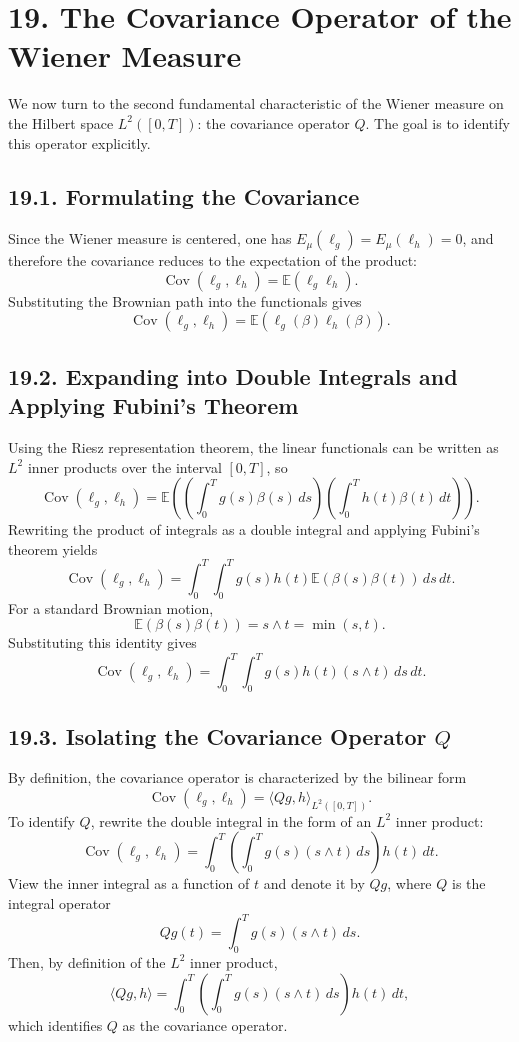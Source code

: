 \documentclass[11pt]{article}
\theoremstyle{definition}
\theoremstyle{remark}
\begin{document}
\section*{19. The Covariance Operator of the Wiener Measure}
We now turn to the second fundamental characteristic of the Wiener measure on the Hilbert space $L^2([0,T])$: the covariance operator $Q$. The goal is to identify this operator explicitly.

\subsection*{19.1. Formulating the Covariance}
Since the Wiener measure is centered, one has $E_\mu(\ell_g)=E_\mu(\ell_h)=0$, and therefore the covariance reduces to the expectation of the product:
\[
\operatorname{Cov}(\ell_g,\ell_h)=\mathbb E(\ell_g\ell_h).
\]
Substituting the Brownian path into the functionals gives
\[
\operatorname{Cov}(\ell_g,\ell_h)=\mathbb E(\ell_g(\beta)\ell_h(\beta)).
\]

\subsection*{19.2. Expanding into Double Integrals and Applying Fubini's Theorem}
Using the Riesz representation theorem, the linear functionals can be written as $L^2$ inner products over the interval $[0,T]$, so
\[
\operatorname{Cov}(\ell_g,\ell_h)
=
\mathbb E\left(\left(\int_0^T g(s)\beta(s)\,ds\right)\left(\int_0^T h(t)\beta(t)\,dt\right)\right).
\]
Rewriting the product of integrals as a double integral and applying Fubini's theorem yields
\[
\operatorname{Cov}(\ell_g,\ell_h)
=
\int_0^T\int_0^T g(s)h(t)\mathbb E(\beta(s)\beta(t))\,ds\,dt.
\]
For a standard Brownian motion,
\[
\mathbb E(\beta(s)\beta(t))=s\wedge t=\min(s,t).
\]
Substituting this identity gives
\[
\operatorname{Cov}(\ell_g,\ell_h)
=
\int_0^T\int_0^T g(s)h(t)(s\wedge t)\,ds\,dt.
\]

\subsection*{19.3. Isolating the Covariance Operator $Q$}
By definition, the covariance operator is characterized by the bilinear form
\[
\operatorname{Cov}(\ell_g,\ell_h)=\langle Qg,h\rangle_{L^2([0,T])}.
\]
To identify $Q$, rewrite the double integral in the form of an $L^2$ inner product:
\[
\operatorname{Cov}(\ell_g,\ell_h)
=
\int_0^T \left(\int_0^T g(s)(s\wedge t)\,ds\right)h(t)\,dt.
\]
View the inner integral as a function of $t$ and denote it by $Qg$, where $Q$ is the integral operator
\[
Qg(t)=\int_0^T g(s)(s\wedge t)\,ds.
\]
Then, by definition of the $L^2$ inner product,
\[
\langle Qg,h\rangle
=
\int_0^T \left(\int_0^T g(s)(s\wedge t)\,ds\right)h(t)\,dt,
\]
which identifies $Q$ as the covariance operator.
\end{document}
